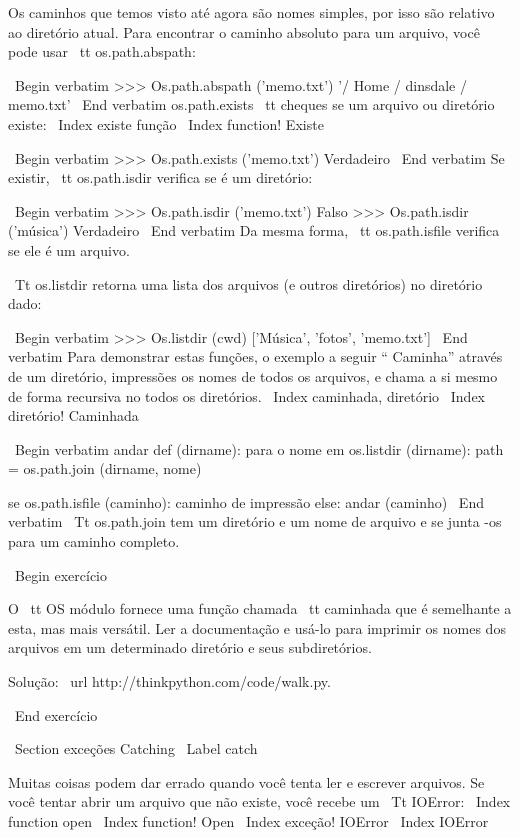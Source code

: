 \documentclass[10pt]{book}
\begin{document}
\begin {itemize}
{{{{{{{{{{Os caminhos que temos visto até agora são nomes simples, por isso são
relativo ao diretório atual. Para encontrar o caminho absoluto para
um arquivo, você pode usar {\ tt os.path.abspath}:

\ Begin {verbatim}
>>> Os.path.abspath ('memo.txt')
'/ Home / dinsdale / memo.txt'
\ End {verbatim}
%
{os.path.exists \ tt} cheques
se um arquivo ou diretório existe:
\ Index {existe função}
\ Index {function! Existe}

\ Begin {verbatim}
>>> Os.path.exists ('memo.txt')
Verdadeiro
\ End {verbatim}
%
Se existir, {\ tt os.path.isdir} verifica se é um diretório:

\ Begin {verbatim}
>>> Os.path.isdir ('memo.txt')
Falso
>>> Os.path.isdir ('música')
Verdadeiro
\ End {verbatim}
%
Da mesma forma, {\ tt os.path.isfile} verifica se ele é um arquivo.

{\ Tt os.listdir} retorna uma lista dos arquivos (e outros diretórios)
no diretório dado:

\ Begin {verbatim}
>>> Os.listdir (cwd)
['Música', 'fotos', 'memo.txt']
\ End {verbatim}
%
Para demonstrar estas funções, o exemplo a seguir
`` Caminha'' através de um diretório, impressões
os nomes de todos os arquivos, e chama a si mesmo de forma recursiva no
todos os diretórios.
\ Index {caminhada, diretório}
\ Index {diretório! Caminhada}

\ Begin {verbatim}
andar def (dirname):
    para o nome em os.listdir (dirname):
        path = os.path.join (dirname, nome)

        se os.path.isfile (caminho):
            caminho de impressão
        else:
            andar (caminho)
\ End {verbatim}
%
{\ Tt os.path.join} tem um diretório e um nome de arquivo e se junta
-os para um caminho completo.  

\ Begin {} exercício

O {\ tt OS} módulo fornece uma função chamada {\ tt caminhada}
que é semelhante a esta, mas mais versátil. Ler
a documentação e usá-lo para imprimir os nomes dos
arquivos em um determinado diretório e seus subdiretórios.

Solução: \ url {http://thinkpython.com/code/walk.py}.

\ End {} exercício


\ Section {exceções Catching}
\ Label {catch}

Muitas coisas podem dar errado quando você tenta ler e escrever
arquivos. Se você tentar abrir um arquivo que não existe, você recebe um
{\ Tt IOError}:
\ Index {function open}
\ Index {function! Open}
\ Index {exceção! IOError}
\ Index {} IOError

}}}}}}}}}}
\end{itemize}
\end{document}
